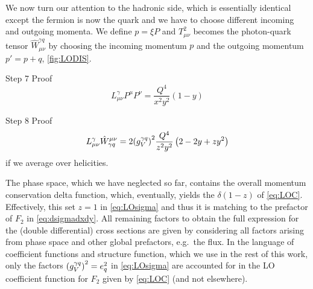 We now turn our attention to the hadronic side, which is essentially identical except the fermion is now the quark and we have to choose different incoming and outgoing momenta.
We define $p = \xi P$ and $T^2_{\mu\nu}$ becomes the photon-quark tensor $\hat W^{\gamma q}_{\mu\nu}$ by choosing the incoming momentum $p$ and the outgoing momentum $p'=p+q$, \cref{fig:LODIS}.
\begin{exercisebox}[label=box:exLOPP]{Step 7}
    Proof
    \begin{equation}
        L^\gamma_{\mu\nu} P^{\mu} P^{\nu} = \frac{Q^4}{x^2 y^2}(1-y)
    \end{equation}
\end{exercisebox}
\begin{exercisebox}[label=box:exLOLW]{Step 8}
    Proof
    \begin{equation}
        L^\gamma_{\mu\nu} \hat W^{\mu\nu}_{\gamma q} = 2\qty(g_{V}^{\gamma q})^2\frac{Q^4}{z^2 y^2}\left(2-2y + z y^2\right) \label{eq:LOsigma}
    \end{equation}
    if we average over helicities.
\end{exercisebox}
The phase space, which we have neglected so far, contains the overall momentum conservation delta function, which, eventually, yields the $\delta(1-z)$ of \cref{eq:LOC}.
Effectively, this set $z=1$ in \cref{eq:LOsigma} and thus it is matching to the prefactor of $F_2$ in \cref{eq:dsigmadxdy}.
All remaining factors to obtain the full expression for the (double differential) cross sections are given by considering all factors arising from phase space and other global prefactors, e.g.\ the flux.
In the language of coefficient functions and structure function, which we use in the rest of this work, only the factors $\qty(g_{V}^{\gamma q})^2 = e_q^2$ in \cref{eq:LOsigma} are accounted for in the LO coefficient function for $F_2$ given by \cref{eq:LOC} (and not elsewhere).
